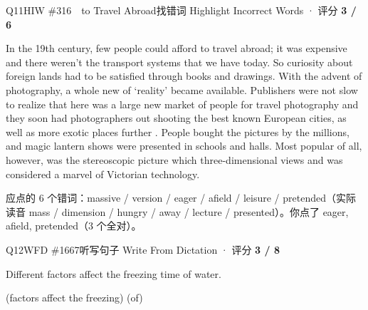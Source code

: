 \begin{qblock}{Q11\quad HIW \#316\ \ to Travel Abroad}{找错词 Highlight Incorrect Words · 评分 \textcolor{cAccent}{\bfseries 3 / 6}}
\begin{promptbox}
In the 19th century, few people could afford to travel abroad; it was expensive and there weren't the  transport systems that we have today. So curiosity about foreign lands had to be satisfied through books and drawings. With the advent of photography, a whole new  of `reality' became available. Publishers were not slow to realize that here was a large new market of people  for travel photography and they soon had photographers out shooting the best known European cities, as well as more exotic places further . People bought the pictures by the millions, and magic lantern shows were presented in schools and  halls. Most popular of all, however, was the stereoscopic picture which  three-dimensional views and was considered a marvel of Victorian technology.
\end{promptbox}
\par{\small 应点的 6 个错词：{\color{cWrong}massive / version / eager / afield / leisure / pretended}\quad（实际读音 mass / dimension / hungry / away / lecture / presented）。\;你点了 {\color{cFix}eager, afield, pretended}（3 个全对）。}
\end{qblock}

\begin{qblock}{Q12\quad WFD \#1667}{听写句子 Write From Dictation · 评分 \textcolor{cAccent}{\bfseries 3 / 8}}
\begin{promptbox}
Different factors affect the freezing time of water.
\end{promptbox}
{\small{} {\color{gray}(factors affect the freezing)}    {\color{gray}(of)} }
\end{qblock}

